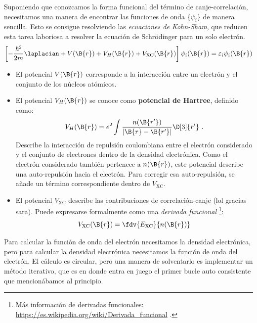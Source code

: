 Suponiendo que conozcamos la forma funcional del término de canje-correlación, necesitamos una manera de encontrar las funciones de onda $\{\psi_i\}$ de manera sencilla. Esto se consigue resolviendo las \emph{ecuaciones de Kohn-Sham}, que reducen esta tarea laboriosa a resolver la ecuación de Schrödinger para un solo electrón.
\begin{equation}
    \left [-\frac{\hbar^2}{2m}\laplacian +V(\B{r}) + V_H(\B{r}) + V_\text{XC}(\B{r}) \right ]\psi_i(\B{r}) = \varepsilon_i\psi_i(\B{r})
\end{equation}
\begin{itemize}
    \item El potencial $V(\B{r})$ corresponde a la interacción entre un electrón y el conjunto de los núcleos atómicos.
    \item El potencial $V_H(\B{r})$ se conoce como \textbf{potencial de Hartree}, definido como:
    $$
     V_H(\B{r})=e^2\int \frac{n(\B{r'})}{|\B{r}-\B{r'}|} \D[3]{r'} \ .
    $$
    Describe la interacción de repulsión coulombiana entre el electrón considerado y el conjunto de electrones dentro de la densidad electrónica. Como el electrón considerado también pertenece a $n(\B{r})$, este potencial describe una auto-repulsión hacia el electrón. Para corregir esa auto-repulsión, se añade un término correspondiente dentro de $V_\text{XC}$.

    \item El potencial $V_\text{XC}$ describe las contribuciones de correlación-canje {\scriptsize (lol gracias sara)}. Puede expresarse formalmente como una  \emph{derivada funcional} \footnote{Más información de derivadas funcionales: \url{https://es.wikipedia.org/wiki/Derivada_funcional} .}:
    $$
    V_\text{XC}(\B{r}) = \fdv{E_\text{XC}}{n(\B{r})}
    $$
\end{itemize}

Para calcular la función de onda del electrón necesitamos la densidad electrónica, pero para calcular la densidad electrónica necesitamos la función de onda del electrón. El cálculo es circular, pero una manera de solventarlo es implementar un método iterativo, que es en donde entra en juego el primer bucle auto consistente que mencionábamos al principio.

\newpage

